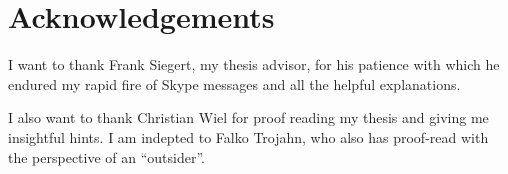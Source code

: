 \section*{Acknowledgements}

I want to thank Frank Siegert, my thesis advisor, for his patience
with which he endured my rapid fire of Skype messages and all the
helpful explanations.

I also want to thank Christian Wiel for proof reading my thesis and
giving me insightful hints. I am indepted to Falko Trojahn, who also
has proof-read with the perspective of an ``outsider''.

